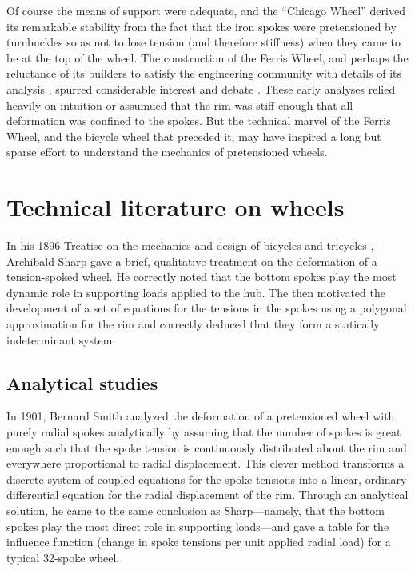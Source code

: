 \documentclass[../thesis.tex]{subfiles}
\begin{document}
Of course the means of support were adequate, and the ``Chicago Wheel'' derived its remarkable stability from the fact that the iron spokes were pretensioned by turnbuckles so as not to lose tension (and therefore stiffness) when they came to be at the top of the wheel. The construction of the Ferris Wheel, and perhaps the reluctance of its builders to satisfy the engineering community with details of its analysis \cite{AmericanRailwayJournal}, spurred considerable interest and debate \cite{AmericanRailwayJournal2,Searles}. These early analyses relied heavily on intuition or assumued that the rim was stiff enough that all deformation was confined to the spokes. But the technical marvel of the Ferris Wheel, and the bicycle wheel that preceded it, may have inspired a long but sparse effort to understand the mechanics of pretensioned wheels.


\section{Technical literature on wheels}




In his 1896 Treatise on the mechanics and design of bicycles and tricycles \cite{Sharp}, Archibald Sharp gave a brief, qualitative treatment on the deformation of a tension-spoked wheel. He correctly noted that the bottom spokes play the most dynamic role in supporting loads applied to the hub. The then motivated the development of a set of equations for the tensions in the spokes using a polygonal approximation for the rim and correctly deduced that they form a statically indeterminant system.

\subsection{Analytical studies}

In 1901, Bernard Smith \cite{Smith} analyzed the deformation of a pretensioned wheel with purely radial spokes analytically by assuming that the number of spokes is great enough such that the spoke tension is continuously distributed about the rim and everywhere proportional to radial displacement. This clever method transforms a discrete system of coupled equations for the spoke tensions into a linear, ordinary differential equation for the radial displacement of the rim. Through an analytical solution, he came to the same conclusion as Sharp---namely, that the bottom spokes play the most direct role in supporting loads---and gave a table for the influence function (change in spoke tensions per unit applied radial load) for a typical 32-spoke wheel.
\end{document}
